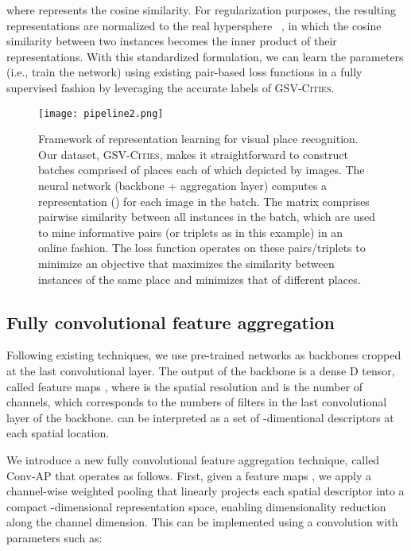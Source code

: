 \documentclass{article}
\begin{document}
where  represents the cosine similarity. For regularization purposes, the resulting representations are normalized to the real hypersphere ~\cite{wu2017sampling}, in which the cosine similarity  between two instances  becomes the inner product of their representations.
With this standardized formulation, we can learn the parameters  (i.e., train the network) using existing pair-based loss functions in a fully supervised fashion by leveraging the accurate labels of \textsc{GSV-Cities}. 


\begin{figure*}[t]
\centering
\texttt{[image: pipeline2.png]}
\caption{Framework of representation learning for visual place recognition. Our dataset, \textsc{GSV-Cities}, makes it straightforward to construct batches comprised of  places each of which depicted by  images. The neural network (backbone + aggregation layer) computes a representation () for each image in the batch. The matrix  comprises pairwise similarity between all instances in the batch, which are used to mine informative pairs (or triplets as in this example) in an online fashion. The loss function operates on these pairs/triplets to minimize an objective that maximizes the similarity between instances of the same place and minimizes that of different places.}
\label{fig:pipeline}
\end{figure*}


\subsection{Fully convolutional feature aggregation}\label{ssec:conv_ap}
Following existing techniques, we use pre-trained networks as backbones cropped at the last convolutional layer.
The output of the backbone is a dense D tensor, called feature maps , where  is the spatial resolution and  is the number of channels, which corresponds to the numbers of filters in the last convolutional layer of the backbone.  can be interpreted as a set of -dimentional descriptors  at each  spatial location.

We introduce a new fully convolutional feature aggregation technique, called Conv-AP that operates as follows. First, given a feature maps , we apply a channel-wise weighted pooling that linearly projects each spatial descriptor  into a compact -dimensional representation space, enabling dimensionality reduction along the channel dimension. This can be implemented using a  convolution with parameters  such as:
\end{document}
